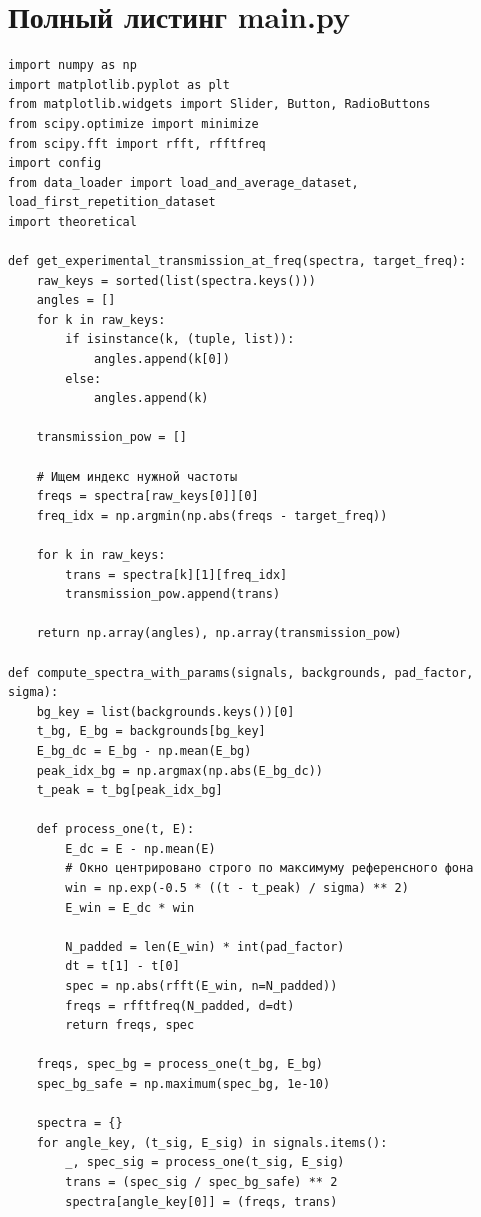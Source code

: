 \section{Полный листинг main.py} \label{app:integrated_app}
\begin{verbatim}
import numpy as np
import matplotlib.pyplot as plt
from matplotlib.widgets import Slider, Button, RadioButtons
from scipy.optimize import minimize
from scipy.fft import rfft, rfftfreq
import config
from data_loader import load_and_average_dataset, load_first_repetition_dataset
import theoretical

def get_experimental_transmission_at_freq(spectra, target_freq):
    raw_keys = sorted(list(spectra.keys()))
    angles = []
    for k in raw_keys:
        if isinstance(k, (tuple, list)):
            angles.append(k[0])
        else:
            angles.append(k)
            
    transmission_pow = []
    
    # Ищем индекс нужной частоты
    freqs = spectra[raw_keys[0]][0]
    freq_idx = np.argmin(np.abs(freqs - target_freq))
    
    for k in raw_keys:
        trans = spectra[k][1][freq_idx]
        transmission_pow.append(trans)
        
    return np.array(angles), np.array(transmission_pow)

def compute_spectra_with_params(signals, backgrounds, pad_factor, sigma):
    bg_key = list(backgrounds.keys())[0]
    t_bg, E_bg = backgrounds[bg_key]
    E_bg_dc = E_bg - np.mean(E_bg)
    peak_idx_bg = np.argmax(np.abs(E_bg_dc))
    t_peak = t_bg[peak_idx_bg]
    
    def process_one(t, E):
        E_dc = E - np.mean(E)
        # Окно центрировано строго по максимуму референсного фона
        win = np.exp(-0.5 * ((t - t_peak) / sigma) ** 2)
        E_win = E_dc * win
        
        N_padded = len(E_win) * int(pad_factor)
        dt = t[1] - t[0]
        spec = np.abs(rfft(E_win, n=N_padded))
        freqs = rfftfreq(N_padded, d=dt)
        return freqs, spec
        
    freqs, spec_bg = process_one(t_bg, E_bg)
    spec_bg_safe = np.maximum(spec_bg, 1e-10)
    
    spectra = {}
    for angle_key, (t_sig, E_sig) in signals.items():
        _, spec_sig = process_one(t_sig, E_sig)
        trans = (spec_sig / spec_bg_safe) ** 2
        spectra[angle_key[0]] = (freqs, trans)
        

\end{verbatim}
